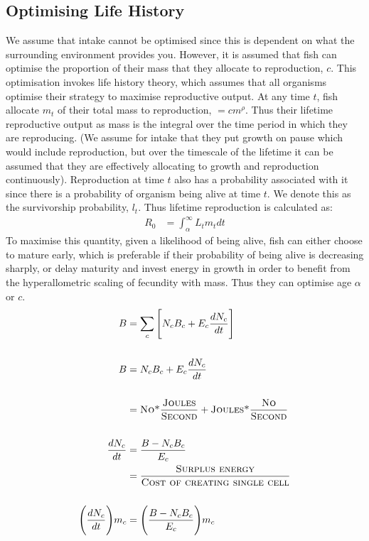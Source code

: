 \documentclass[a3paper]{article} %
\begin{document}
\begin{multicols}{2}
\section{Optimising Life History}
We assume that intake cannot be optimised since this is dependent on what the surrounding environment provides you. However, it is assumed that fish can optimise the proportion of their mass that they allocate to reproduction, $c$. This optimisation invokes life history theory, which assumes that all organisms optimise their strategy to maximise reproductive output. At any time $t$, fish allocate $m_{t}$ of their total mass to reproduction, $= cm^{\rho}$. Thus their lifetime reproductive output as mass is the integral over the time period in which they are reproducing. (We assume for intake that they put growth on pause which would include reproduction, but over the timescale of the lifetime it can be assumed that they are effectively allocating to growth and reproduction continuously). Reproduction at time $t$ also has a probability associated with it since there is a probability of organism being alive at time $t$. We denote this as the survivorship probability, $l_{t}$. Thus lifetime reproduction is calculated as:
\begin{align}
    R_{0} &= \int_{\alpha}^{\infty}L_{t}m_{t} dt 
\end{align}
To maximise this quantity, given a likelihood of being alive, fish can either choose to mature early, which is preferable if their probability of being alive is decreasing sharply, or delay maturity and invest energy in growth in order to benefit from the hyperallometric scaling of fecundity with mass. Thus they can optimise age $\alpha$ or $c$.
\columnbreak
\vfill\null
\newpage
\begin{align*}
    B &= \sum_c \Bigg[N_{c}B_{c} + E_{c}\frac{dN_{c}}{dt}\Bigg] \\ \\
    B &= N_{c}B_{c} + E_{c}\frac{dN_{c}}{dt} \\ \\
    &= \textsc{No*}\frac{\textsc{Joules}}{\textsc{Second}} + \textsc{Joules*}\frac{\textsc{No}}{\textsc{Second}}\\ \\
    \frac{dN_{c}}{dt} &= \frac{B - N_{c}B_{c}}{E_{c}} \\
    &= \frac{\textsc{Surplus energy}}{\textsc{Cost of creating single cell}} \\ \\
    \Bigg(\frac{dN_{c}}{dt}\Bigg)m_c &= \Bigg(\frac{B - N_{c}B_{c}}{E_{c}}\Bigg)m_c \\ \\

\end{align*}
\end{multicols}
\end{document}
